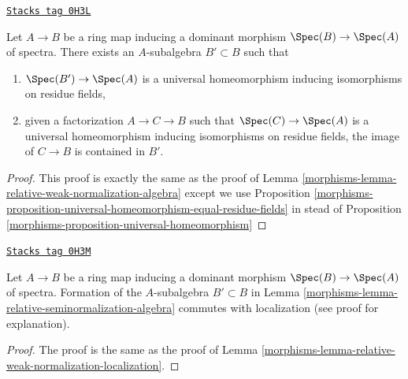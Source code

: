 \begin{lemma}
\label{morphisms-lemma-relative-seminormalization-algebra}
\href{https://stacks.math.columbia.edu/tag/0H3L}{\texttt{Stacks tag 0H3L}}

Let $A \to B$ be a ring map inducing a dominant morphism
$\Spec(B) \to \Spec(A)$ of spectra. There exists an $A$-subalgebra
$B' \subset B$ such that
\begin{enumerate}
\item $\Spec(B') \to \Spec(A)$ is a universal homeomorphism inducing
isomorphisms on residue fields,
\item given a factorization $A \to C \to B$ such that $\Spec(C) \to \Spec(A)$
is a universal homeomorphism inducing isomorphisms on residue fields,
the image of $C \to B$ is contained in $B'$.
\end{enumerate}
\end{lemma}

\begin{proof}

This proof is exactly the same as the proof of
Lemma \ref{morphisms-lemma-relative-weak-normalization-algebra} except we use
Proposition \ref{morphisms-proposition-universal-homeomorphism-equal-residue-fields}
in stead of Proposition \ref{morphisms-proposition-universal-homeomorphism}
\end{proof}

\begin{lemma}
\label{morphisms-lemma-relative-seminormalization-localization}
\href{https://stacks.math.columbia.edu/tag/0H3M}{\texttt{Stacks tag 0H3M}}

Let $A \to B$ be a ring map inducing a dominant morphism
$\Spec(B) \to \Spec(A)$ of spectra. Formation of the $A$-subalgebra
$B' \subset B$ in Lemma \ref{morphisms-lemma-relative-seminormalization-algebra}
commutes with localization (see proof for explanation).
\end{lemma}

\begin{proof}

The proof is the same as the proof of
Lemma \ref{morphisms-lemma-relative-weak-normalization-localization}.
\end{proof}

